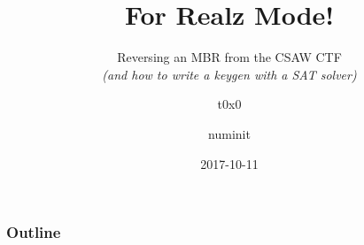 \documentclass{beamer}
\title{For Realz Mode!}
\subtitle{
    Reversing an MBR from the CSAW CTF\\
    {\em (and how to write a keygen with a SAT solver)}
}
\author{t0x0 \and numinit}
\institute{DC858, DC619, and \VaporSec}
\date{2017-10-11}
\begin{document}
\begin{frame}
    \titlepage
\end{frame}

\begin{frame}
    \frametitle{Outline}
    \tableofcontents[]
\end{frame}





\end{document}
